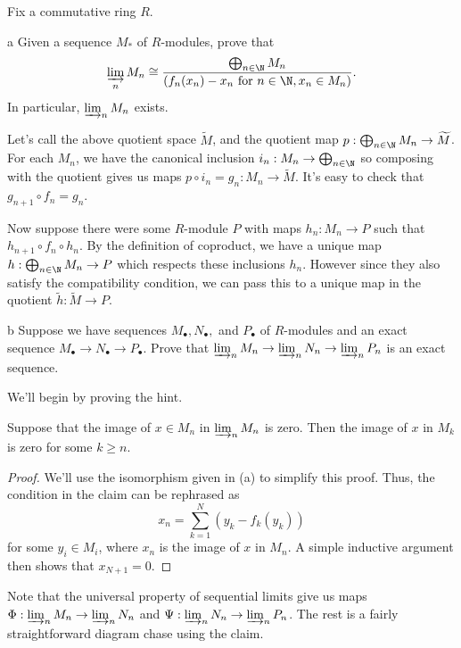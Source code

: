 \documentclass[11pt,letterpaper]{article}
\begin{document}
\begin{solution}
    \quad Fix a commutative ring $R$.
    \begin{partproblem}{a}
        Given a sequence $M_*$ of $R$-modules, prove that
        \[
            \varinjlim_n M_n \cong \frac{\bigoplus_{n\in \N} M_n}{\left(f_n(x_n)-x_n\text { for }n\in \N, x_n\in M_n\right)}
        .\]
        In particular, $\varinjlim_n M_n$ exists. 
    \end{partproblem}
    \quad Let's call the above quotient space $\widetilde{M}$, and the quotient map $p : \bigoplus_{n\in \N}M_n \to \widetilde{M}$. For each $M_n$, we have the canonical inclusion $i_n : M_n \to \bigoplus_{n\in \N}$ so composing with the quotient gives us maps $p\circ i_n = g_n : M_n \to \widetilde{M}$. It's easy to check that $g_{n+1}\circ f_n = g_n$.

    \quad Now suppose there were some $R$-module $P$ with maps $h_n : M_n \to P$ such that $h_{n+1}\circ f_n\circ h_n$. By the definition of coproduct, we have a unique map $h : \bigoplus_{n\in \N} M_n \to P$ which respects these inclusions $h_n$. However since they also satisfy the compatibility condition, we can pass this to a unique map in the quotient $\widetilde{h} : \widetilde{M} \to P$.

    \begin{partproblem}{b}
        Suppose we have sequences $M_\bullet, N_\bullet,$ and $P_\bullet$ of $R$-modules and an exact sequence $M_\bullet \to N_\bullet \to P_\bullet$. Prove that $\varinjlim_n M_n \to \varinjlim_n N_n \to \varinjlim_n P_n$ is an exact sequence.
    \end{partproblem}

    \quad We'll begin by proving the hint.
    \begin{claim}
        Suppose that the image of $x \in M_n$ in $\varinjlim_n M_n$ is zero. Then the image of $x$ in $M_k$ is zero for some $k \geq n$.
    \end{claim}
    \begin{proof}
        We'll use the isomorphism given in (a) to simplify this proof. Thus, the condition in the claim can be rephrased as
        \[
            x_n = \sum_{k=1}^N (y_k-f_k(y_k))
        \]
        for some $y_i\in M_i$, where $x_n$ is the image of $x$ in $M_n$. A simple inductive argument then shows that $x_{N+1}=0$.
    \end{proof}
    Note that the universal property of sequential limits give us maps $\Phi : \varinjlim_n M_n \to \varinjlim_n N_n$ and $\Psi : \varinjlim_n N_n \to \varinjlim_n P_n$. The rest is a fairly straightforward diagram chase using the claim.


\end{solution}
\end{document}

